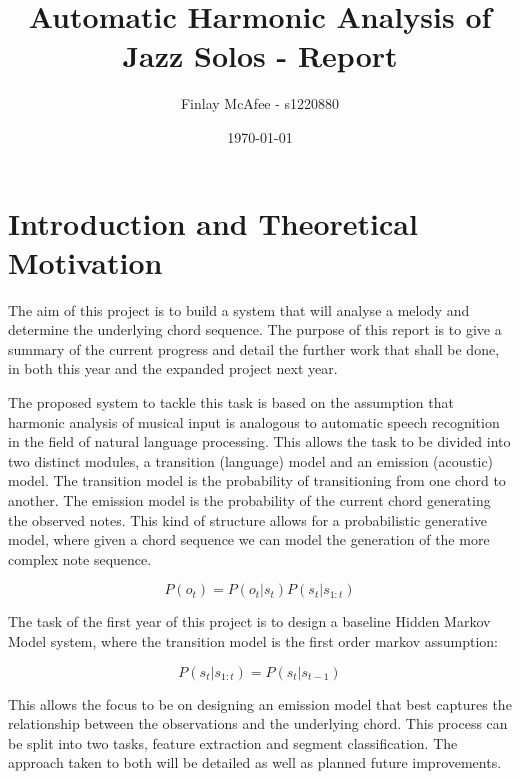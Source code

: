 \documentclass[bsc,singlespacing,parskip,deptreport,twoside,frontabs]{infthesis}
\begin{document}
\title{Automatic Harmonic Analysis of Jazz Solos - Report}

\author{Finlay McAfee - s1220880}


\date{\today
}


\maketitle

\tableofcontents



\chapter{Introduction and Theoretical Motivation}

The aim of this project is to build a system that will analyse a melody and determine the underlying chord sequence. The purpose of this report is to give a summary of the current progress and detail the further work that shall be done, in both this year and the expanded project next year.

The proposed system to tackle this task is based on the assumption that harmonic analysis of musical input is analogous to automatic speech recognition in the field of natural language processing. This allows the task to be divided into two distinct modules, a transition (language) model and an emission (acoustic) model. The transition model is the probability of transitioning from one chord to another. The emission model is the probability of the current chord generating the observed notes. This kind of structure allows for a probabilistic generative model, where given a chord sequence we can model the generation of the more complex note sequence.

$$
P(o_t) = P(o_t | s_t)P(s_t | s_{1:t}) 
$$

The task of the first year of this project is to design a baseline Hidden Markov Model system, where the transition model is the first order markov assumption:

$$
P(s_t | s_{1:t}) = P(s_t | s_{t-1}) 
$$

This allows the focus to be on designing an emission model that best captures the relationship between the observations and the underlying chord. This process can be split into two tasks, feature extraction and segment classification. The approach taken to both will be detailed as well as planned future improvements. 
\end{document}
